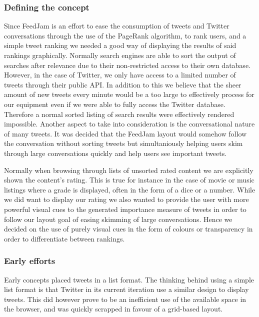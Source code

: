 \subsubsection{Defining the concept}
Since FeedJam is an effort to ease the consumption of tweets and Twitter conversations through the use of the PageRank algorithm, to rank users, and a simple tweet ranking we needed a good way of displaying the results of said rankings graphically. Normally search engines are able to sort the output of searches after relevance due to their non-restricted access to their own database. However, in the case of Twitter, we only have access to a limited number of tweets through their public API. In addition to this we believe that the sheer amount of new tweets every minute would be a too large to effectively process for our equipment even if we were able to fully access the Twitter database. Therefore a normal sorted listing of search results were effectively rendered impossible. Another aspect to take into consideration is the conversational nature of many tweets. It was decided that the FeedJam layout would somehow follow the conversation without sorting tweets but simultaniously helping users skim through large conversations quickly and help users see important tweets.

Normally when browsing through lists of unsorted rated content we are explicitly shown the content's rating. This is true for instance in the case of movie or music listings where a grade is displayed, often in the form of a dice or a number. While we did want to display our rating we also wanted to provide the user with more powerful visual cues to the generated importance measure of tweets in order to follow our layout goal of easing skimming of large conversations. Hence we decided on the use of purely visual cues in the form of colours or transparency in order to differentiate between rankings.

\subsubsection{Early efforts}
Early concepts placed tweets in a list format. The thinking behind using a simple list format is that Twitter in its current iteration use a similar design to display tweets. This did however prove to be an inefficient use of the available space in the browser, and was quickly scrapped in favour of a grid-based layout.

